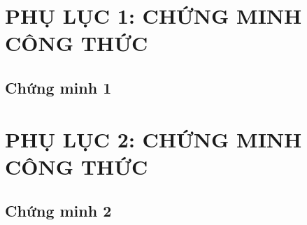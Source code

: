 \appendix

\chapter*{PHỤ LỤC 1: CHỨNG MINH CÔNG THỨC}


\section{Chứng minh 1}

\chapter*{PHỤ LỤC 2: CHỨNG MINH CÔNG THỨC}


\section{Chứng minh 2}
